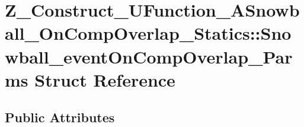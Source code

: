 \hypertarget{struct_z___construct___u_function___a_snowball___on_comp_overlap___statics_1_1_snowball__event_on_comp_overlap___parms}{}\section{Z\+\_\+\+Construct\+\_\+\+U\+Function\+\_\+\+A\+Snowball\+\_\+\+On\+Comp\+Overlap\+\_\+\+Statics\+::Snowball\+\_\+event\+On\+Comp\+Overlap\+\_\+\+Parms Struct Reference}
\label{struct_z___construct___u_function___a_snowball___on_comp_overlap___statics_1_1_snowball__event_on_comp_overlap___parms}
\subsection*{Public Attributes}
